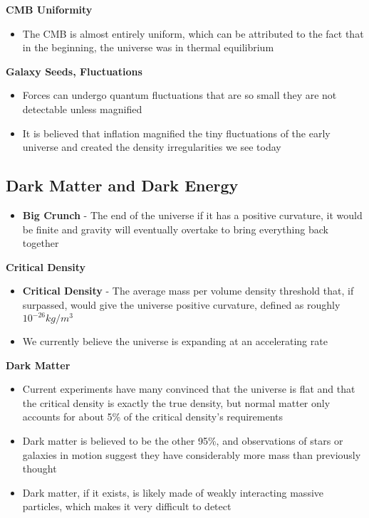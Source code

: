 \textbf{CMB Uniformity}
\begin{itemize}
    \item The CMB is almost entirely uniform, which can be attributed to the fact that in the beginning, the universe was in thermal equilibrium
\end{itemize}

\textbf{Galaxy Seeds, Fluctuations}
\begin{itemize}
    \item Forces can undergo quantum fluctuations that are so small they are not detectable unless magnified
    \item It is believed that inflation magnified the tiny fluctuations of the early universe and created the density irregularities we see today
\end{itemize}

\subsection{Dark Matter and Dark Energy}
\begin{itemize}
    \item \textbf{Big Crunch} - The end of the universe if it has a positive curvature, it would be finite and gravity will eventually overtake to bring everything back together
\end{itemize}

\textbf{Critical Density}
\begin{itemize}
    \item \textbf{Critical Density} - The average mass per volume density threshold that, if surpassed, would give the universe positive curvature, defined as roughly \(10^{-26}kg/m^3\)
    \item We currently believe the universe is expanding at an accelerating rate
\end{itemize}

\textbf{Dark Matter}
\begin{itemize}
    \item Current experiments have many convinced that the universe is flat and that the critical density is exactly the true density, but normal matter only accounts for about 5\% of the critical density's requirements
    \item Dark matter is believed to be the other 95\%, and observations of stars or galaxies in motion suggest they have considerably more mass than previously thought
    \item Dark matter, if it exists, is likely made of weakly interacting massive particles, which makes it very difficult to detect
\end{itemize}

